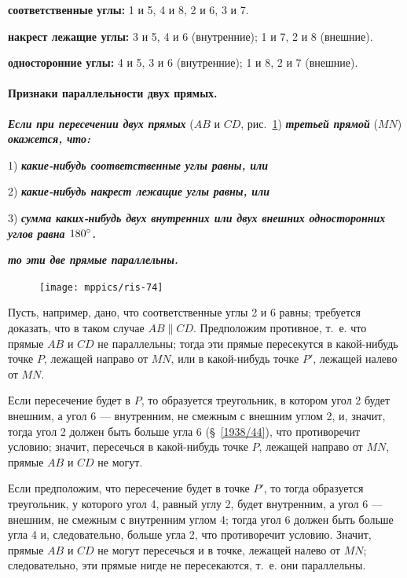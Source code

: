 \documentclass[oneside]{book}
\begin{document}
\textbf{соответственные углы:}
1 и 5, 4 и 8, 2 и 6, 3 и 7.

\textbf{накрест лежащие углы:}
3 и 5, 4 и 6 (внутренние);
1 и 7, 2 и 8 (внешние).

\textbf{односторонние углы:}
4 и 5, 3 и 6 (внутренние);
1 и 8, 2 и 7 (внешние).

\paragraph{Признаки параллельности двух прямых.}\label{1938/73}
\textbf{\emph{Если при пересечении двух прямых}} ($AB$ и $CD$, рис.~\ref{1938/ris-74}) \textbf{\emph{третьей прямой}} ($MN$) \textbf{\emph{окажется, что:}}

1) \textbf{\emph{какие-нибудь соответственные углы равны, или}}

2) \textbf{\emph{какие-нибудь накрест лежащие углы равны, или}}

3) \textbf{\emph{сумма каких-нибудь двух внутренних или двух внешних односторонних углов равна $180\degree$.}}

\noindent\textbf{\emph{то эти две прямые параллельны.}}

\begin{figure}[h!]
\centering
\texttt{[image: mppics/ris-74]}
\caption{}\label{1938/ris-74}
\end{figure}

Пусть, например, дано, что соответственные углы 2 и 6 равны;
требуется доказать, что в таком случае $AB \parallel CD$.
Предположим противное, т.~е. что прямые $AB$ и $CD$ не параллельны;
тогда эти прямые пересекутся в какой-нибудь точке $P$, лежащей направо от $MN$, или в какой-нибудь точке $P'$, лежащей налево от $MN$.

Если пересечение будет в $P$, то образуется треугольник, в котором угол 2 будет внешним, а угол 6 — внутренним, не смежным с внешним углом 2, и, значит, тогда угол 2 должен быть больше угла 6 (§~\ref{1938/44}), что противоречит условию;
значит, пересечься в какой-нибудь точке $P$, лежащей направо от $MN$, прямые $AB$ и $CD$ не могут.

Если предположим, что пересечение будет в точке $P'$, то тогда образуется треугольник, у которого угол 4, равный углу 2, будет внутренним, а угол 6 — внешним, не смежным с внутренним углом 4;
тогда угол 6 должен быть больше угла 4 и, следовательно, больше угла 2, что противоречит условию.
Значит, прямые $AB$ и $CD$ не могут пересечься и в точке, лежащей налево от $MN$;
следовательно, эти прямые нигде не пересекаются, т.~е. они параллельны.
\end{document}
